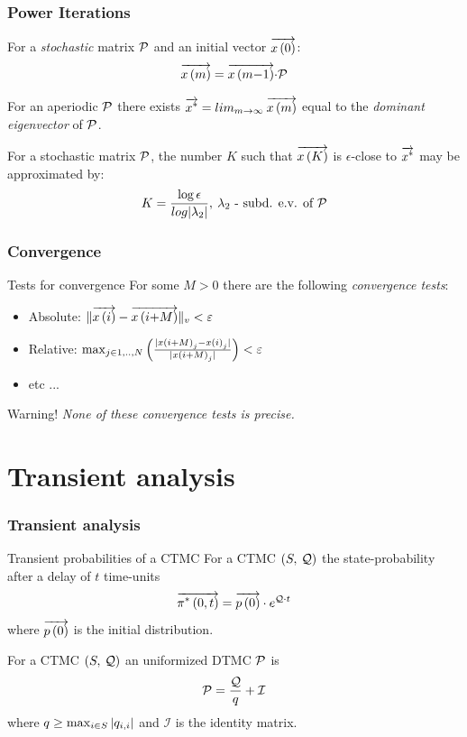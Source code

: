 \documentclass{beamer}
\begin{document}
\frame
{
	\frametitle{Power Iterations  \cite{Stewart_94}}
	{\small
		\begin{definition}
			For a \emph{stochastic} matrix $\mathcal{P}$ and an initial vector $\overrightarrow{x\left(0\right)}$:
			\begin{equation}
				\overrightarrow{x\left(m\right)} = \overrightarrow{x\left(m{-}1\right)}{\cdot}\mathcal{P} \nonumber
			\end{equation}
		\end{definition}
		\begin{theorem}
			For an \alert{aperiodic} $\mathcal{P}$ there exists $\overrightarrow{x^{*}} = lim_{m \to \infty} \: \overrightarrow{x\left(m\right)}$ equal to the \emph{dominant eigenvector} of $\mathcal{P}$.
		\end{theorem}
		\begin{lemma}
			For a stochastic matrix $\mathcal{P}$, the number $K$ such that $\overrightarrow{x\left(K\right)}$ is $\epsilon$-close to $\overrightarrow{x^{*}}$ may be approximated by:
			\begin{equation}
				K = \dfrac{\log \epsilon}{log | \lambda_{2} |}, \: \lambda_{2} \textrm{ - subd. e.v. of }\mathcal{P} \nonumber
			\end{equation}
		\end{lemma}
	}
}
	
\frame
{
	\frametitle{Convergence \cite{Stewart_94}}
	
	\begin{block}{Tests for convergence}
		For some $M>0$ there are the following \emph{convergence tests}:
		\begin{itemize}
			\item Absolute: $\lVert \overrightarrow{x\left(i\right)} - \overrightarrow{x\left(i{+}M\right)} \rVert_{v} < \varepsilon$
			\item Relative: $\max_{j \in 1,..,N} \left( \frac{ | x\left(i{+}M\right)_{j} - x\left(i\right)_{j} |}{ | x\left(i{+}M\right)_{j} |} \right) < \varepsilon$
			\item etc ...
		\end{itemize}
	\end{block}
	
	\begin{alertblock}{Warning!}
		\emph{None of these convergence tests is precise.}
	\end{alertblock}
}

\section{Transient analysis}


\frame
{
	\frametitle{Transient analysis}
	\begin{block}{Transient probabilities of a CTMC}
		For a CTMC $\left( S,\: \mathcal{Q} \right)$ the state-probability after a delay of $t$ time-units
		\begin{equation}
			\overrightarrow{\pi^{*} \left(0, t \right )} = \overrightarrow{p \left( 0 \right)} \cdot e^{\mathcal{Q}{\cdot}t}
			\nonumber
		\end{equation}
		where $\overrightarrow{p \left( 0 \right)}$ is the initial distribution.
	\end{block}
	
	\begin{definition}
		For a CTMC $\left( S,\: \mathcal{Q} \right)$ an uniformized DTMC $\mathcal{P}$ is
		\[
			\mathcal{P}=\frac{\mathcal{Q}}{q}+\mathcal{I}
		\]
		where $q \geq \max_{i \in S}| q_{i,i} |$ and $\mathcal{I}$ is the identity matrix.
	\end{definition}
}
\end{document}

